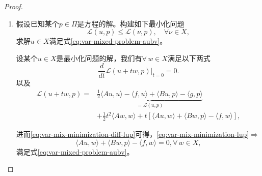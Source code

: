 \begin{proof}
\begin{enumerate}
\item 假设已知某个$p \in \Pi$是方程的解。构建如下最小化问题
\begin{equation}
  \label{eq:var-mix-minimization-problem}
  \mathcal{L}(u,p) \le \mathcal{L}(\nu,p), \quad \forall \nu \in X,
\end{equation}
求解$u \in X$满足式\eqref{eq:var-mixed-problem-aubv}。

设某个$u \in X$是最小化问题的解，我们有$\forall \, w \in X$满足以下两式
\begin{equation}
  \label{eq:var-mix-minimization-diff-lup}
  \frac{d}{dt} \mathcal{L} \left(u + tw, p \right)|_{t=0} =0.
\end{equation}
以及
\begin{equation}
\label{eq:var-mix-minimization-lup}
\begin{split}
    \mathcal{L} \left(u + tw, p \right) =& \underbrace{\frac{1}{2} \langle A u, u \rangle - \langle f, u \rangle + \langle Bu,p \rangle - \langle g, p \rangle}_{ = \mathcal{L}(u,p)} \\
    &+ \frac{1}{2} t^2 \langle A w, w \rangle + t
    \left[
    \langle A u, w \rangle + \langle B w, p \rangle - \langle f, w \rangle
    \right],
\end{split}
\end{equation}

进而\eqref{eq:var-mix-minimization-diff-lup}可得，\eqref{eq:var-mix-minimization-lup}$\Rightarrow$
\begin{equation*}
  \langle A u, w \rangle + \langle B w, p \rangle - \langle f, w \rangle = 0, \forall \, w \in X,
\end{equation*}
满足式\eqref{eq:var-mixed-problem-aubv}。



\end{enumerate}
\end{proof}
